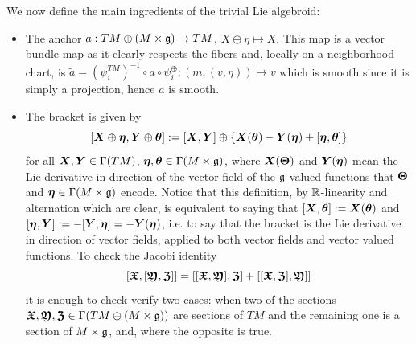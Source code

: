 We now define the main ingredients of the trivial Lie algebroid:
    \begin{itemize}
    \item The anchor $a: TM \oplus (M \times \mathfrak{g}) \to TM$, $X \oplus \eta \mapsto X$. This map is a vector bundle map as it clearly respects the fibers and, locally on a neighborhood chart, is $\tilde a = (\psi^{TM}_i)^{-1} \circ a \circ \psi^{\oplus}_i: (m, (v, \eta)) \mapsto v$ which is smooth since it is simply a projection, hence $a$ is smooth.
    
    \item The bracket is given by 
    \[
        [\bm{X} \oplus \bm{\eta}, \bm{Y} \oplus \bm{\theta}] := [\bm{X}, \bm{Y}] \oplus \{\bm{X}(\bm{\theta}) - \bm{Y}(\bm{\eta}) + [\bm{\eta}, \bm{\theta}]\}
    \]
    for all $\bm{X}, \bm{Y} \in \Gamma(TM)$, $\bm{\eta}, \bm{\theta} \in \Gamma(M \times \mathfrak{g})$, where $\bm{X}(\bm{\Theta})$ and $\bm{Y}(\bm{\eta})$ mean the Lie derivative in direction of the vector field of the $\mathfrak{g}$-valued functions that $\bm{\Theta}$ and $\bm{\eta} \in \Gamma(M \times \mathfrak{g})$ encode. %
    Notice that this definition, by $\mathbb{R}$-linearity and alternation which are clear, is equivalent to saying that $[\bm{X}, \bm{\theta}] := \bm{X}(\bm{\theta})$ and $[\bm{\eta}, \bm{Y}] := - [\bm{Y}, \bm{\eta}] = -\bm{Y}(\bm{\eta})$, i.e. to say that the bracket is the Lie derivative in direction of vector fields, applied to both vector fields and vector valued functions. %
    To check the Jacobi identity
    \[ [\bm{\mathfrak{X}}, [\bm{\mathfrak{Y}}, \bm{\mathfrak{Z}}]] = [[\bm{\mathfrak{X}}, \bm{\mathfrak{Y}}], \bm{\mathfrak{Z}}] + [[\bm{\mathfrak{X}}, \bm{\mathfrak{Z}}], \bm{\mathfrak{Y}}]] \] it is enough to check verify two cases: when two of the sections $\bm{\mathfrak{X}}, \bm{\mathfrak{Y}}, \bm{\mathfrak{Z}} \in \Gamma(TM \oplus (M \times \mathfrak{g}))$ are sections of $TM$ and the remaining one is a section of $M \times \mathfrak{g}$, and, where the opposite is true.
    \end{itemize}


